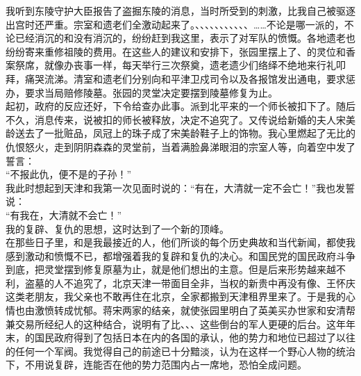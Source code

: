 我听到东陵守护大臣报告了盗掘东陵的消息，当时所受到的刺激，比我自己被驱逐出宫时还严重。宗室和遗老们全激动起来了。、、、、、、、、、、、……不论是哪一派的，不论已经消沉的和没有消沉的，纷纷赶到我这里，表示了对军队的愤慨。各地遗老也纷纷寄来重修祖陵的费用。在这些人的建议和安排下，张园里摆上了、的灵位和香案祭席，就像办丧事一样，每天举行三次祭奠，遗老遗少们络绎不绝地来行礼叩拜，痛哭流涕。清室和遗老们分别向和平津卫戍司令以及各报馆发出通电，要求惩办，要求当局赔修陵墓。张园的灵堂决定要摆到陵墓修复为止。\\

起初，政府的反应还好，下令给查办此事。派到北平来的一个师长被扣下了。随后不久，消息传来，说被扣的师长被释放，决定不追究了。又传说给新婚的夫人宋美龄送去了一批赃品，凤冠上的珠子成了宋美龄鞋子上的饰物。我心里燃起了无比的仇恨怒火，走到阴阴森森的灵堂前，当着满脸鼻涕眼泪的宗室人等，向着空中发了誓言：\\

“不报此仇，便不是的子孙！”\\

我此时想起到天津和我第一次见面时说的：“有在，大清就一定不会亡！”我也发誓说：\\

“有我在，大清就不会亡！”\\

我的复辟、复仇的思想，这时达到了一个新的顶峰。\\

在那些日子里，和是我最接近的人，他们所谈的每个历史典故和当代新闻，都使我感到激动和愤慨不已，都增强着我的复辟和复仇的决心。和国民党的国民政府斗争到底，把灵堂摆到修复原墓为止，就是他们想出的主意。但是后来形势越来越不利，盗墓的人不追究了，北京天津一带面目全非，当权的新贵中再没有像、王怀庆这类老朋友，我父亲也不敢再住在北京，全家都搬到天津租界里来了。于是我的心情也由激愤转成忧郁。蒋宋两家的结亲，就使张园里明白了英美买办世家和安清帮兼交易所经纪人的这种结合，说明有了比、、、这些倒台的军人更硬的后台。这年年末，的国民政府得到了包括日本在内的各国的承认，他的势力和地位已超过了以往的任何一个军阀。我觉得自己的前途已十分黯淡，认为在这样一个野心人物的统治下，不用说复辟，连能否在他的势力范围内占一席地，恐怕全成问题。\\

